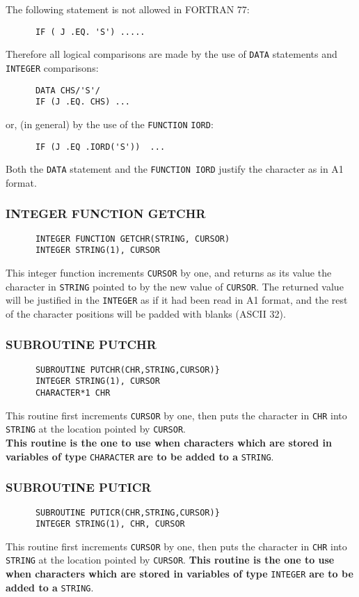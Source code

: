 The following statement is not allowed in FORTRAN 77:
\begin{verbatim}
      IF ( J .EQ. 'S') .....
\end{verbatim}
Therefore all logical comparisons are made by the use of {\tt DATA}
statements and {\tt INTEGER} comparisons:
\begin{verbatim}
      DATA CHS/'S'/
      IF (J .EQ. CHS) ...
\end{verbatim}
or, (in general) by the use of the {\tt FUNCTION} {\tt IORD}:
\begin{verbatim}
      IF (J .EQ .IORD('S'))  ...
\end{verbatim}
Both the {\tt DATA} statement and the {\tt FUNCTION IORD}
justify the character
as in A1 format.
\subsubsection{\sf INTEGER FUNCTION GETCHR}
\begin{verbatim}
      INTEGER FUNCTION GETCHR(STRING, CURSOR)
      INTEGER STRING(1), CURSOR
\end{verbatim}
This integer function increments  {\tt CURSOR} by one, 
and returns as its value
the character in {\tt STRING} pointed to by the 
new value of {\tt CURSOR}. The returned value will
be justified in the {\tt INTEGER} as if it had been read in A1 format, 
and the
rest of the character positions will be padded with blanks (ASCII 32).  
\subsubsection{\sf SUBROUTINE PUTCHR}
\begin{verbatim}
      SUBROUTINE PUTCHR(CHR,STRING,CURSOR)}
      INTEGER STRING(1), CURSOR
      CHARACTER*1 CHR
\end{verbatim}
This routine first increments {\tt CURSOR} by one, 
then puts the character  in
{\tt CHR} into {\tt STRING} at the location pointed by  {\tt CURSOR}. \\
{\bf This routine is the one to use when characters which are stored in
variables of type} {\tt CHARACTER} {\bf are to be added to a }
{\tt STRING}.
\subsubsection{\sf SUBROUTINE PUTICR}
\begin{verbatim}
      SUBROUTINE PUTICR(CHR,STRING,CURSOR)}
      INTEGER STRING(1), CHR, CURSOR
\end{verbatim}
This routine first increments {\tt CURSOR} by one, 
then puts the character  in
{\tt CHR} into {\tt STRING} at the location pointed by  {\tt CURSOR}.
{\bf This routine is the one to use when characters which are stored in
variables of type} {\tt INTEGER} {\bf are to be added to a }
{\tt STRING}. \\

